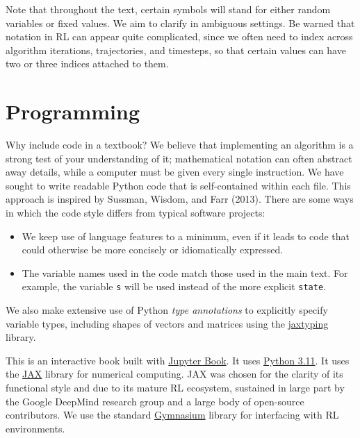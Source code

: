 \documentclass[
  letterpaper,
  DIV=11,
  numbers=noendperiod]{scrreprt}
\providecommand{\tightlist}{%
  \setlength{\itemsep}{0pt}\setlength{\parskip}{0pt}}\usepackage{longtable,booktabs,array}
\theoremstyle{plain}
\theoremstyle{plain}
\theoremstyle{definition}
\theoremstyle{definition}
\theoremstyle{remark}
\begin{document}
Note that throughout the text, certain symbols will stand for either
random variables or fixed values. We aim to clarify in ambiguous
settings. Be warned that notation in RL can appear quite complicated,
since we often need to index across algorithm iterations, trajectories,
and timesteps, so that certain values can have two or three indices
attached to them.

\section*{Programming}\label{sec-programming}


Why include code in a textbook? We believe that implementing an
algorithm is a strong test of your understanding of it; mathematical
notation can often abstract away details, while a computer must be given
every single instruction. We have sought to write readable Python code
that is self-contained within each file. This approach is inspired by
Sussman, Wisdom, and Farr (2013). There are some ways in which the code
style differs from typical software projects:

\begin{itemize}
\tightlist
\item
  We keep use of language features to a minimum, even if it leads to
  code that could otherwise be more concisely or idiomatically
  expressed.
\item
  The variable names used in the code match those used in the main text.
  For example, the variable \texttt{s} will be used instead of the more
  explicit \texttt{state}.
\end{itemize}

We also make extensive use of Python \emph{type annotations} to
explicitly specify variable types, including shapes of vectors and
matrices using the
\href{https://github.com/patrick-kidger/jaxtyping}{jaxtyping} library.

This is an interactive book built with
\href{https://jupyterbook.org/en/stable/intro.html}{Jupyter Book}. It
uses \href{https://docs.python.org/3.11/contents.html}{Python 3.11}. It
uses the \href{https://jax.readthedocs.io/en/latest/index.html}{JAX}
library for numerical computing. JAX was chosen for the clarity of its
functional style and due to its mature RL ecosystem, sustained in large
part by the Google DeepMind research group and a large body of
open-source contributors. We use the standard
\href{https://gymnasium.farama.org/}{Gymnasium} library for interfacing
with RL environments.
\end{document}
